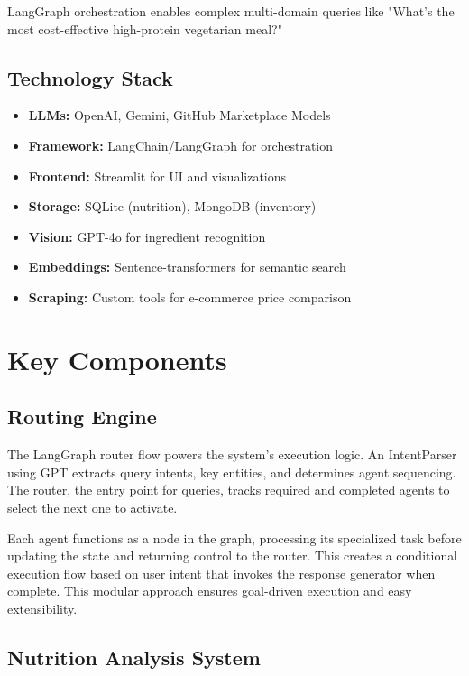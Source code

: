 \documentclass{ecai}
\begin{document}
LangGraph orchestration enables complex multi-domain queries like "What's the most cost-effective high-protein vegetarian meal?"

\subsection{Technology Stack}

\begin{itemize}[noitemsep,topsep=0pt]
    \item \textbf{LLMs:} OpenAI, Gemini, GitHub Marketplace Models
    \item \textbf{Framework:} LangChain/LangGraph for orchestration
    \item \textbf{Frontend:} Streamlit for UI and visualizations
    \item \textbf{Storage:} SQLite (nutrition), MongoDB (inventory)
    \item \textbf{Vision:} GPT-4o for ingredient recognition
    \item \textbf{Embeddings:} Sentence-transformers for semantic search
    \item \textbf{Scraping:} Custom tools for e-commerce price comparison
\end{itemize}

\section{Key Components}

\subsection{Routing Engine}

The LangGraph router flow powers the system's execution logic. An IntentParser using GPT extracts query intents, key entities, and determines agent sequencing. The router, the entry point for queries, tracks required and completed agents to select the next one to activate.

Each agent functions as a node in the graph, processing its specialized task before updating the state and returning control to the router. This creates a conditional execution flow based on user intent that invokes the response generator when complete. This modular approach ensures goal-driven execution and easy extensibility.

\subsection{Nutrition Analysis System}
\end{document}
